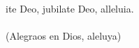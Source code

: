 \begin{cancion}%
	ite Deo, jubilate Deo, alleluia.\\
	\jump\\
(Alegraos en Dios, aleluya)\\
\end{cancion}%
